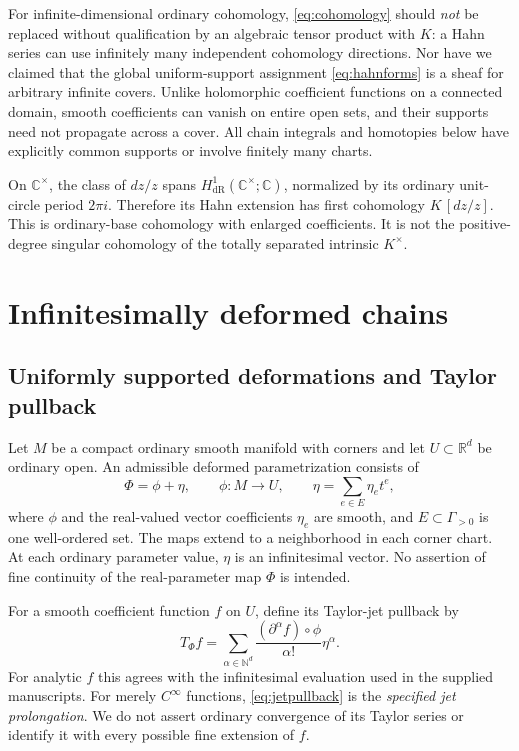 \documentclass[11pt,letterpaper]{article}
\theoremstyle{definition}
\theoremstyle{remark}
\newcommand{\C}{\mathbb C}\newcommand{\R}{\mathbb R}\newcommand{\Q}{\mathbb Q}\newcommand{\Z}{\mathbb Z}\newcommand{\N}{\mathbb N}
\newcommand{\dR}{\mathrm{dR}}\newcommand{\sh}{^{\sharp}}\newcommand{\abs}[1]{\left|#1\right|}
\numberwithin{equation}{section}
\begin{document}
For infinite-dimensional ordinary cohomology, \eqref{eq:cohomology} should \emph{not} be replaced without qualification by an algebraic tensor product with $K$: a Hahn series can use infinitely many independent cohomology directions. Nor have we claimed that the global uniform-support assignment \eqref{eq:hahnforms} is a sheaf for arbitrary infinite covers. Unlike holomorphic coefficient functions on a connected domain, smooth coefficients can vanish on entire open sets, and their supports need not propagate across a cover. All chain integrals and homotopies below have explicitly common supports or involve finitely many charts.

\begin{example}
On $\C^\times$, the class of $dz/z$ spans $H^1_{\dR}(\C^\times;\C)$, normalized by its ordinary unit-circle period $2\pi i$. Therefore its Hahn extension has first cohomology $K\,[dz/z]$. This is ordinary-base cohomology with enlarged coefficients. It is not the positive-degree singular cohomology of the totally separated intrinsic $K^\times$.
\end{example}

\section{Infinitesimally deformed chains}\label{sec:deformed}
\subsection{Uniformly supported deformations and Taylor pullback}
Let $M$ be a compact ordinary smooth manifold with corners and let $U\subset\R^d$ be ordinary open. An admissible deformed parametrization consists of
\begin{equation}\label{eq:deformedmap}
 \Phi=\phi+\eta,\qquad
 \phi:M\longrightarrow U,\qquad
 \eta=\sum_{e\in E}\eta_e t^e,
\end{equation}
where $\phi$ and the real-valued vector coefficients $\eta_e$ are smooth, and $E\subset\Gamma_{>0}$ is one well-ordered set. The maps extend to a neighborhood in each corner chart. At each ordinary parameter value, $\eta$ is an infinitesimal vector. No assertion of fine continuity of the real-parameter map $\Phi$ is intended.

For a smooth coefficient function $f$ on $U$, define its Taylor-jet pullback by
\begin{equation}\label{eq:jetpullback}
 T_\Phi f=\sum_{\alpha\in\N^d}
    \frac{(\partial^\alpha f)\circ\phi}{\alpha!}\eta^\alpha.
\end{equation}
For analytic $f$ this agrees with the infinitesimal evaluation used in the supplied manuscripts. For merely $C^\infty$ functions, \eqref{eq:jetpullback} is the \emph{specified jet prolongation}. We do not assert ordinary convergence of its Taylor series or identify it with every possible fine extension of $f$.
\end{document}
